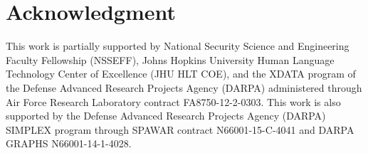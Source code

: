\documentclass[times,twocolumn,final]{elsarticle}
\begin{document}
\section*{Acknowledgment}
This work is partially supported by National Security Science and Engineering Faculty Fellowship (NSSEFF),
 Johns Hopkins University Human Language Technology Center of Excellence (JHU HLT COE), and the
 XDATA program of the Defense Advanced Research Projects Agency (DARPA) administered through Air Force Research Laboratory contract FA8750-12-2-0303. This work is also supported by the Defense Advanced Research Projects Agency (DARPA) SIMPLEX program through SPAWAR contract N66001-15-C-4041 and DARPA GRAPHS N66001-14-1-4028.





\end{document}
